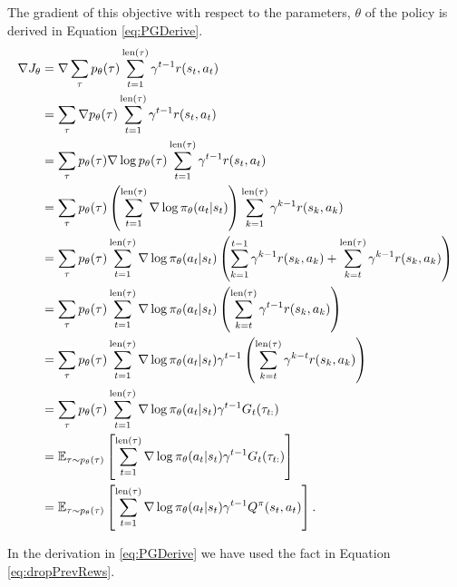 \documentclass{report}
\numberwithin{equation}{section}
\numberwithin{figure}{section}
\numberwithin{table}{section}
\numberwithin{algorithm}{section}
\begin{document}
The gradient of this objective with respect to the parameters, $\theta$ 
of the policy is derived in Equation \ref{eq:PGDerive}.
\begin{align}\label{eq:PGDerive}
  \nabla J_\theta&=\nabla\sum_{\tau}p_{\theta}(\tau)\sum_{t=1}^{\text{len}(\tau)}\gamma^{t-1}r(s_t, a_t)\notag\\
  &=\sum_{\tau}\nabla p_{\theta}(\tau)\sum_{t=1}^{\text{len}(\tau)}\gamma^{t-1}r(s_t, a_t)\notag\\
  &=\sum_{\tau}p_{\theta}(\tau)\nabla \log p_\theta(\tau)\sum_{t=1}^{\text{len}(\tau)}\gamma^{t-1}r(s_t, a_t)\notag\\
  &=\sum_{\tau}p_{\theta}(\tau)\left(
    \sum_{t=1}^{\text{len}(\tau)}\nabla \log \pi_\theta(a_t|s_t)
  \right)\sum_{k=1}^{\text{len}(\tau)}\gamma^{k-1}r(s_k, a_k)\notag\\
  &=\sum_{\tau}p_\theta(\tau)\sum_{t=1}^{\text{len}(\tau)}\nabla \log \pi_\theta(a_t|s_t)
  \left(
    \sum_{k=1}^{t-1}\gamma^{k-1}r(s_k, a_k)
    + \sum_{k=t}^{\text{len}(\tau)}\gamma^{k-1}r(s_k, a_k)
  \right)\notag\\
  &=\sum_{\tau}p_\theta(\tau)\sum_{t=1}^{\text{len}(\tau)}\nabla \log \pi_\theta(a_t|s_t)
  \left(
    \sum_{k=t}^{\text{len}(\tau)}\gamma^{t-1}r(s_k, a_k)
  \right)\notag\\
  &=\sum_{\tau}p_\theta(\tau)\sum_{t=1}^{\text{len}(\tau)}\nabla \log \pi_\theta(a_t|s_t)
  \gamma^{t-1}\left(
    \sum_{k=t}^{\text{len}(\tau)}\gamma^{k-t}r(s_k, a_k)
  \right)\notag\\
  &=\sum_{\tau}p_\theta(\tau)\sum_{t=1}^{\text{len}(\tau)}\nabla \log \pi_\theta(a_t|s_t)
  \gamma^{t-1}G_t(\tau_{t:})\notag\\
  &=\mathbb{E}_{\tau\sim p_\theta(\tau)}\left[\sum_{t=1}^{\text{len}(\tau)}\nabla \log \pi_\theta(a_t|s_t)
  \gamma^{t-1}G_t(\tau_{t:})\right]\notag\\
  &=\mathbb{E}_{\tau\sim p_\theta(\tau)}\left[\sum_{t=1}^{\text{len}(\tau)}\nabla \log \pi_\theta(a_t|s_t)
  \gamma^{t-1}Q^{\pi}(s_t, a_t)\right].
\end{align}

In the derivation in \ref{eq:PGDerive} we have used the 
fact in Equation \ref{eq:dropPrevRews}.
\end{document}
